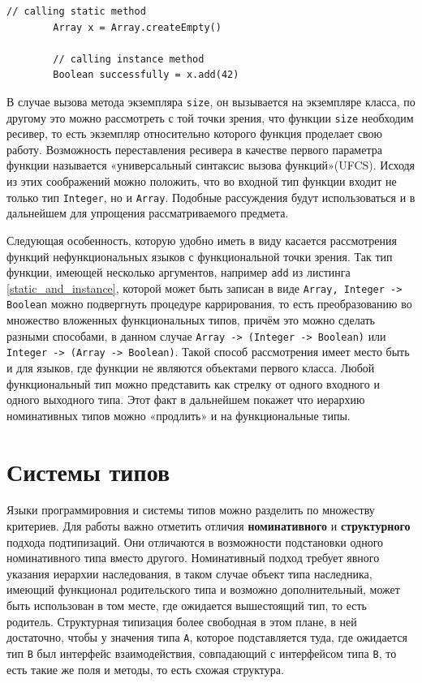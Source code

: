\documentclass[times]{itmo-student-thesis}
\begin{document}
	\begin{lstlisting}[caption={Пример вызова статической и нестатической функции},label={static_and_instance}]
		// calling static method
		Array x = Array.createEmpty()
		
		// calling instance method
		Boolean successfully = x.add(42)
	\end{lstlisting}
	
	В случае вызова метода экземпляра  \lstinline{size}, он вызывается на экземпляре класса, по другому это можно рассмотреть с той точки зрения, что функции  \lstinline{size} необходим ресивер, то есть экземпляр относительно которого функция проделает свою работу.  Возможность переставления ресивера в качестве первого параметра функции называется «универсальный синтаксис вызова функций»(UFCS). Исходя из этих соображений можно положить, что во входной тип функции входит не только тип  \lstinline{Integer}, но и   \lstinline{Array}. Подобные рассуждения будут использоваться и в дальнейшем для упрощения рассматриваемого предмета.
	
	Следующая особенность, которую удобно иметь в виду касается рассмотрения функций нефункциональных языков с функциональной точки зрения. Так тип функции, имеющей несколько аргументов, например  \lstinline{add} из листинга \ref{static_and_instance}, которой может быть записан в виде  \lstinline{Array, Integer -> Boolean} можно подвергнуть процедуре каррирования, то есть преобразованию во множество вложенных функциональных типов, причём это можно сделать разными способами, в данном случае  \lstinline{Array -> (Integer -> Boolean)} или  \lstinline{Integer -> (Array -> Boolean)}. Такой способ рассмотрения имеет место быть и для языков, где функции не являются объектами первого класса. Любой функциональный тип можно представить как стрелку от одного входного и одного выходного типа. Этот факт в дальнейшем покажет что иерархию номинативных типов можно «продлить» и на функциональные типы.
	
	
	\section{Системы типов}
	
	Языки программировния и системы типов можно разделить по множеству критериев. Для работы важно отметить отличия \textbf{номинативного} и \textbf{структурного} подхода подтипизаций. Они отличаются в возможности подстановки одного номинативного типа вместо другого. Номинативный подход требует явного указания иерархии наследования, в таком случае объект типа наследника, имеющий функционал родительского типа и возможно дополнительный, может быть использован в том месте, где ожидается вышестоящий тип, то есть родитель. Структурная типизация более свободная в этом плане, в ней достаточно, чтобы у значения типа  \lstinline{A}, которое подставляется туда, где ожидается тип \lstinline{B} был интерфейс взаимодействия, совпадающий с интерфейсом типа  \lstinline{B}, то есть такие же поля и методы, то есть схожая структура.
	
\end{document}
